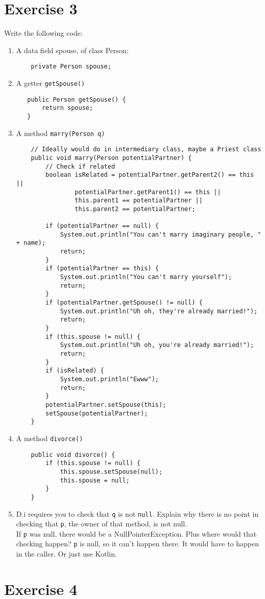 \documentclass[12pt]{article}
\begin{document}
\section{Exercise 3}
Write the following code:
\begin{enumerate}[label=(\alph*)]
\item A data field spouse, of class Person:
  \begin{verbatim}
    private Person spouse;
  \end{verbatim}
\item A getter {\tt getSpouse()}
  \begin{verbatim}
   public Person getSpouse() {
       return spouse;
   }
  \end{verbatim}
\item A method {\tt marry(Person q)}
  \begin{verbatim}
    // Ideally would do in intermediary class, maybe a Priest class
    public void marry(Person potentialPartner) {
        // Check if related
        boolean isRelated = potentialPartner.getParent2() == this ||
                potentialPartner.getParent1() == this ||
                this.parent1 == potentialPartner ||
                this.parent2 == potentialPartner;

        if (potentialPartner == null) {
            System.out.println("You can't marry imaginary people, " + name);
            return;
        }
        if (potentialPartner == this) {
            System.out.println("You can't marry yourself");
            return;
        }
        if (potentialPartner.getSpouse() != null) {
            System.out.println("Uh oh, they're already married!");
            return;
        }
        if (this.spouse != null) {
            System.out.println("Uh oh, you're already married!");
            return;
        }
        if (isRelated) {
            System.out.println("Ewww");
            return;
        }
        potentialPartner.setSpouse(this);
        setSpouse(potentialPartner);
    }
  \end{verbatim}
\item A method {\tt divorce() }
  \begin{verbatim}
    public void divorce() {
        if (this.spouse != null) {
            this.spouse.setSpouse(null);
            this.spouse = null;
        }
    }
  \end{verbatim}
\item D.i requires you to check that {\tt q} is not {\tt null}. Explain why
  there is no point in checking that {\tt p}, the owner of that method, is not null. \\

  If {\tt p} was null, there would be a NullPointerException. Plus where would
  that checking happen? {\tt p} is null, so it can't happen there. It would have
  to happen in the caller. Or just use Kotlin.

\end{enumerate}
\section{Exercise 4}
\begin{enumerate}[label=(\alph*)]
\end{enumerate}
\end{document}
